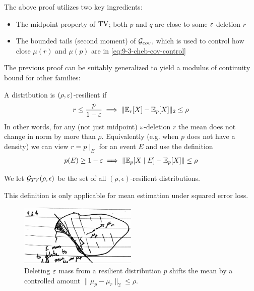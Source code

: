 The above proof utilizes two key ingredients:
\begin{itemize}
    \item The midpoint property of $\operatorname{TV}$; both $p$ and $q$ are close to some $\varepsilon$-deletion $r$
    \item The bounded tails (second moment) of $\mathcal{G}_{cov}$, which is used to control how close $\mu(r)$
    and $\mu(p)$ are in \cref{eq:9-3-cheb-cov-control}
\end{itemize}

The previous proof can be suitably generalized to yield a modulus of continuity bound
for other families:
\begin{definition}\label{def:resilience}
    A distribution is $(\rho, \varepsilon)$-resilient if
    \begin{align}\label{eq:resilience-property}
        r \leq \frac{p}{1 - \varepsilon} \implies \|\mathbb{E}_r[X] - \mathbb{E}_p[X]\|_2 \leq \rho
    \end{align}
    In other words, for any (not just midpoint) $\varepsilon$-deletion $r$ the mean does not change in
    norm by more than $\rho$. Equivalently (e.g. when $p$ does not have a density) we can view $r = p \mid_E$
    for an event $E$ and use the definition
    \begin{align}
        p(E) \geq 1 - \varepsilon \implies \|\mathbb{E}_p[X \mid E] - \mathbb{E}_p[X]\| \leq \rho
    \end{align}

    We let $\mathcal{G}_{TV}(\rho, \epsilon)$ be the set of all $(\rho, \epsilon)$-resilient distributions.
\end{definition}

\begin{remark}
    This definition is only applicable for mean estimation under squared error loss.
\end{remark}

\begin{figure}[H]
    \centering
    \includegraphics[width=0.5\textwidth]{figures/9-3-4.png}
    \caption{Deleting $\varepsilon$ mass from a resilient distribution $p$ shifts the mean by a controlled
    amount $\|\mu_p - \mu_r\|_2 \leq \rho$.}
\end{figure}

